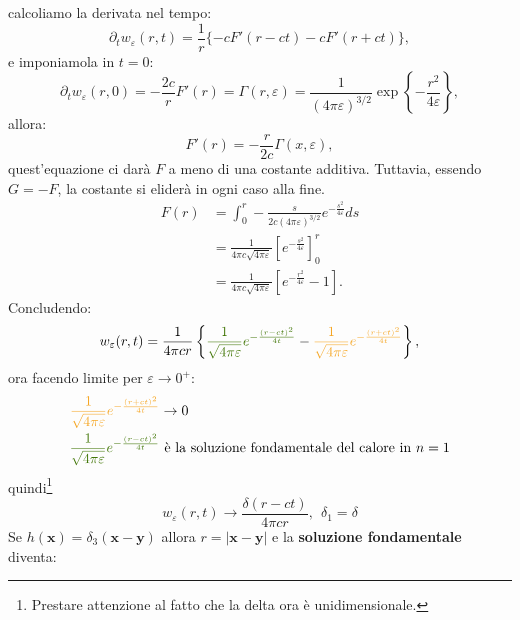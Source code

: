 \documentclass[10pt,a4paper,twoside,openright]{book}
\newcommand{\x}{\mathbf{x}}
\newcommand{\y}{\mathbf{y}}
\begin{document}
calcoliamo la derivata nel tempo:
\begin{equation*}
	\partial _{t} w_{\varepsilon }( r,t) =\frac{1}{r}\{-cF'( r-ct) -cF'( r+ct)\} ,
\end{equation*}
e imponiamola in $\displaystyle t=0$:
\begin{equation*}
	\partial _{t} w_{\varepsilon }( r,0) =-\frac{2c}{r} F'( r) =\Gamma ( r,\varepsilon ) =\frac{1}{( 4\pi \varepsilon )^{3/2}}\exp\left\{-\frac{r^{2}}{4\varepsilon }\right\} ,
\end{equation*}
allora:
\begin{equation*}
	F'( r) =-\frac{r}{2c} \Gamma ( x,\varepsilon ) ,
\end{equation*}
quest'equazione ci darà $\displaystyle F$ a meno di una costante additiva. Tuttavia, essendo $\displaystyle G=-F$, la costante si eliderà in ogni caso alla fine.
\begin{align*}
	F( r) & =\int _{0}^{r} -\frac{s}{2c( 4\pi \varepsilon )^{3/2}} e^{-\frac{s^{2}}{4\varepsilon }} ds      \\
	      & =\frac{1}{4\pi c\sqrt{4\pi \varepsilon }}\left[ e^{-\frac{s^{2}}{4\varepsilon }}\right]_{0}^{r} \\
	      & =\frac{1}{4\pi c\sqrt{4\pi \varepsilon }}\left[ e^{-\frac{r^{2}}{4\varepsilon }} -1\right] .    
\end{align*}
Concludendo:
\begin{equation*}
	w_{\varepsilon }( r,t) =\frac{1}{4\pi cr}\left\{\textcolor[rgb]{0.25,0.46,0.02}{\frac{1}{\sqrt{4\pi \varepsilon }}e^{-\frac{( r-ct)^{2}}{4t}}} -\textcolor[rgb]{0.96,0.65,0.14}{\frac{1}{\sqrt{4\pi \varepsilon }}e^{-\frac{( r+ct)^{2}}{4t}}}\right\} ,
\end{equation*}
ora facendo limite per $\displaystyle \varepsilon \rightarrow 0^{+}$:
\begin{align*}
	\textcolor[rgb]{0.96,0.65,0.14}{\frac{1}{\sqrt{4\pi \varepsilon }}e^{-\frac{( r+ct)^{2}}{4t}}} & \rightarrow 0                                            \\
	\textcolor[rgb]{0.25,0.46,0.02}{\frac{1}{\sqrt{4\pi \varepsilon }}e^{-\frac{( r-ct)^{2}}{4t}}} & \ \text{è la soluzione fondamentale del calore in}\ n=1 
\end{align*}
quindi\footnote{Prestare attenzione al fatto che la delta ora è unidimensionale.}
\begin{equation*}
	w_{\varepsilon }( r,t)\rightarrow \frac{\delta ( r-ct)}{4\pi cr} ,\ \ \delta _{1} =\delta 
\end{equation*}
Se $\displaystyle h(\x) =\delta _{3}(\x -\y)$ allora $\displaystyle r=| \x -\y| $ e la \textbf{soluzione fondamentale} diventa:
\end{document}
